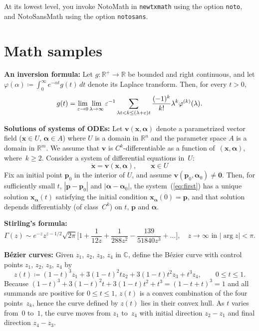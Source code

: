 \documentclass[]{article}
\begin{document}
At its lowest level, you invoke NotoMath in {\tt newtxmath} using the option {\tt noto}, and NotoSansMath using the option  {\tt notosans}.

\section*{Math samples}
\def\bE{\mathbf{E}}
\def\bB{\mathbf{B}}
\def\bJ{\mathbf{J}}

\def\bx{\mathbf{x}}
\def\by{\mathbf{y}}
\def\bv{\mathbf{v}}
\def\bp{\mathbf{p}}
\def\bxdot{\mathbf{\dot x}}
\def\bal{\boldsymbol{\alpha}}
\def\bphi{\boldsymbol{\varphi}}
\def\e{\varepsilon}
\textbf{An inversion formula:} Let $g:\mathbb{R}^+\to \mathbb{R}$
 be bounded and right continuous, and let
$\varphi(\alpha)\coloneqq\int_0^\infty e^{-\alpha t}g(t)\,dt$ denote its Laplace transform. Then, for every $t>0$,
\begin{equation}
g(t)=\lim_{\mathstrut\e\to 0}\lim_{\mathstrut\lambda\to\infty}\e^{-1}\sum_{\lambda t<k\le (\lambda+\e)t}
\frac{(-1)^k}{k!}\lambda^k\varphi ^{(k)}(\lambda).
\end{equation}

\textbf{Solutions of systems of ODEs:} Let $\bv(\bx,\bal)$ denote a parametrized vector field ($\bx\in U$, $\bal\in A$) where $U$ is a domain in $\mathbb{R}^n$ and the parameter space $A$ is a domain in $\mathbb{R}^m$. We assume that $\bv$ is $C^k$-differentiable as a function of~$(\bx,\bal)$, where~$k\ge 2$. Consider a system of differential equations in~$U$:
\begin{equation}
\bxdot=\bv(\bx,\bal),\qquad \bx\in U\label{eq:first}
\end{equation}
 Fix an initial point $\bp_0$ in the interior of $U$, and assume $\bv(\bp_0,\bal_0)\neq\mathbf{0}$. Then, for sufficiently small $t$, $|\bp-\bp_0|$ and $|\bal-\bal_0|$, the system~(\ref{eq:first}) has a unique solution $\bx_{\bal}(t)$  satisfying the initial condition $\bx_{\bal}(0)=\bp$, and that solution depends differentiably (of class~$C^k$) on $t$, $\bp$ and $\bal$.

\textbf{Stirling's formula:} 
\begin{equation}
\Gamma(z)\sim e^{-z}z^{z-1/2}\sqrt{2\pi}\bigg[1+\frac{1}{12z}+\frac{1}{288z^2}-\frac{139}{51840z^3}+\ldots\bigg],\quad z\to\infty \text{ in $|\arg z|<\pi$}.
\end{equation}

\textbf{B\'ezier curves:} Given $z_1$,
$z_2$,
$z_3$,
$z_4$ in  $\mathbb{C}$, define  the B\'ezier
curve with control points $z_1$, $z_2$, $z_3$, $z_4$ by
\[z(t)\coloneqq(1-t)^3z_1+3(1-t)^2tz_2+3(1-t)t^2z_3+t^3z_4,\qquad 0\le t\le 1.\]
Because $(1-t)^3+3(1-t)^2t+3(1-t)t^2+t^3=(1-t+t)^3=1$
and all summands are positive for $0\le t\le1$, $z(t)$
is a convex combination of the four points~$z_k$, hence
the curve defined by $z(t)$ lies in their convex hull. As $t$ varies from~$0$ to~$1$, the curve moves from
$z_1$ to~$z_4$ with initial direction $z_2-z_1$ and final direction $z_4-z_3$. 
\end{document}
